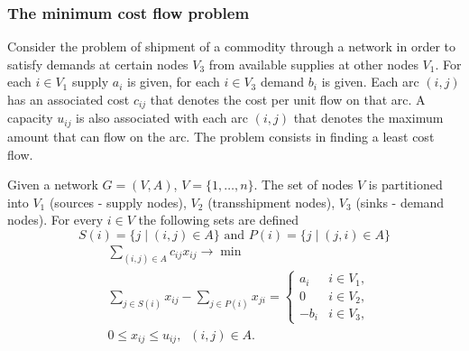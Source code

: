 \documentclass[landscape]{beamer}
\begin{document}
\begin{frame}[fragile]
  \frametitle{The minimum cost flow problem }   
\begin{footnotesize}
 Consider the problem of shipment of
a commodity through a network in order to
satisfy demands  at certain nodes $V_3$
from available supplies  
at other nodes $V_1$.
For each $i\in V_1$ supply $a_i$ is given,
for each $i\in V_3$ demand $b_i$ is given.
Each arc $(i,j)$ has an associated cost $c_{ij}$
that denotes the cost per unit flow on that arc.
A capacity $u_{ij}$ is also associated with 
each arc $(i,j)$
that denotes the maximum amount that can flow
on the arc.
The problem consists in finding a least cost flow.

Given a network $G=(V,A)$, $V=\{1,\ldots,n\}$. 
The set of nodes $V$ is partitioned into $V_1$ (sources - supply nodes),
$V_2$ (transshipment nodes), $V_3$ (sinks - demand nodes).
For every  $i\in V$ the following sets are defined
\[
 S(i)=\{j\;|\; (i,j)\in A\} \text{ and }
 P(i)=\{j\;|\; (j,i)\in A\}
\]
\begin{align*}
 &\sum_{(i,j)\in A}c_{ij}x_{ij}\rightarrow \min\\
&\sum_{j\in S(i)}x_{ij}-
\sum_{j\in P(i)}x_{ji}=
\left\{
\begin{array}{rr}
a_i & i\in V_1,\\
0       & i\in V_2,\\
 -b_i& i\in V_3, 
\end{array}
\right. \\
&0\leq x_{ij}\leq u_{ij}, \;\; (i,j)\in A.
\end{align*}
\end{footnotesize}
\end{frame}
\end{document}
